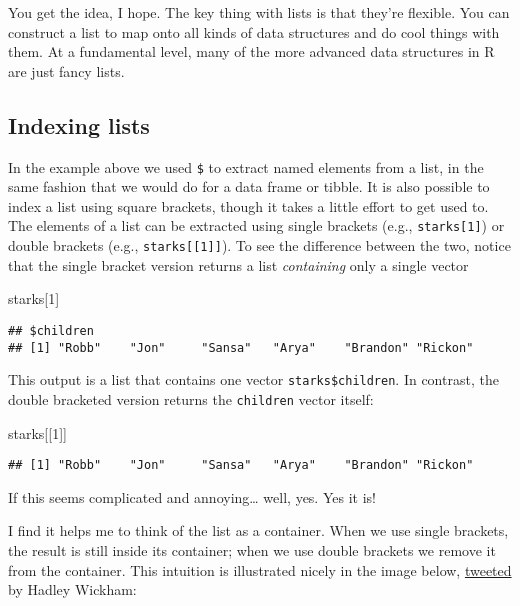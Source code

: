 \documentclass[]{book}
\newenvironment{Shaded}{\begin{snugshade}}{\end{snugshade}}
\newcommand{\DecValTok}[1]{\textcolor[rgb]{0.00,0.00,0.81}{#1}}
\newcommand{\NormalTok}[1]{#1}
\begin{document}
You get the idea, I hope. The key thing with lists is that they're flexible. You can construct a list to map onto all kinds of data structures and do cool things with them. At a fundamental level, many of the more advanced data structures in R are just fancy lists.

\hypertarget{indexing-lists}{%
\subsection{Indexing lists}\label{indexing-lists}}

In the example above we used \texttt{\$} to extract named elements from a list, in the same fashion that we would do for a data frame or tibble. It is also possible to index a list using square brackets, though it takes a little effort to get used to. The elements of a list can be extracted using single brackets (e.g., \texttt{starks{[}1{]}}) or double brackets (e.g., \texttt{starks{[}{[}1{]}{]}}). To see the difference between the two, notice that the single bracket version returns a list \emph{containing} only a single vector

\begin{Shaded}
\begin{Highlighting}[]
\NormalTok{starks[}\DecValTok{1}\NormalTok{]}
\end{Highlighting}
\end{Shaded}

\begin{verbatim}
## $children
## [1] "Robb"    "Jon"     "Sansa"   "Arya"    "Brandon" "Rickon"
\end{verbatim}

This output is a list that contains one vector \texttt{starks\$children}. In contrast, the double bracketed version returns the \texttt{children} vector itself:

\begin{Shaded}
\begin{Highlighting}[]
\NormalTok{starks[[}\DecValTok{1}\NormalTok{]]}
\end{Highlighting}
\end{Shaded}

\begin{verbatim}
## [1] "Robb"    "Jon"     "Sansa"   "Arya"    "Brandon" "Rickon"
\end{verbatim}

If this seems complicated and annoying\ldots{} well, yes. Yes it is!

I find it helps me to think of the list as a container. When we use single brackets, the result is still inside its container; when we use double brackets we remove it from the container. This intuition is illustrated nicely in the image below, \href{https://twitter.com/hadleywickham/status/643381054758363136}{tweeted} by Hadley Wickham:
\end{document}
